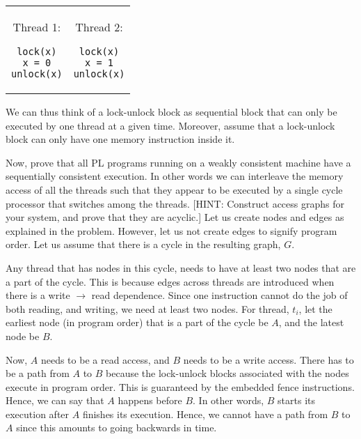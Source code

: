 \begin{ExerciseList}
\begin{tabular}{cc}

\begin{minipage}{0.4\textwidth}
Thread 1:
\begin{Verbatim}
lock(x)
x = 0
unlock(x)
\end{Verbatim}
\end{minipage}

&

\begin{minipage}{0.4\textwidth}
Thread 2:
\begin{Verbatim}
lock(x)
x = 1
unlock(x)
\end{Verbatim}
\end{minipage}
\end{tabular}

We can thus think of a lock-unlock block as sequential block that can only be executed by one
thread at a given time. Moreover, assume that a lock-unlock block can only have one memory
instruction inside it.

Now, prove that all PL programs running on a weakly consistent machine have a sequentially
consistent execution. In other words we can interleave the memory access of all the threads such
that they appear to be executed by a single cycle processor that switches among the threads. 
[HINT: Construct access graphs for your system, and prove that they are acyclic.]
\Answer
Let us create nodes and edges as explained in the problem. However, let us not create edges to signify
program order. Let us assume that there is a cycle in the resulting graph, $G$. 

Any thread that has nodes in this cycle, needs to have at least two nodes that are a part of the cycle.
This is because edges across threads are introduced when there is a write $\rightarrow$ read dependence.
Since one instruction cannot do the job of both reading, and writing, we need at least two nodes. 
For thread, $t_i$, let the earliest node (in program order) that is a part of the cycle be $A$, and 
the latest node be $B$. 

Now, $A$ needs to be a read access, and $B$ needs to be a write access. There has to be a path
from $A$ to $B$ because the lock-unlock blocks associated with the nodes execute in program order.
This is guaranteed by the embedded fence instructions. Hence, we can say that $A$ happens before $B$.
In other words, $B$ starts its execution after $A$ finishes its execution. Hence, we cannot have a path
from $B$ to $A$ since this amounts to going backwards in time.


\end{ExerciseList}
